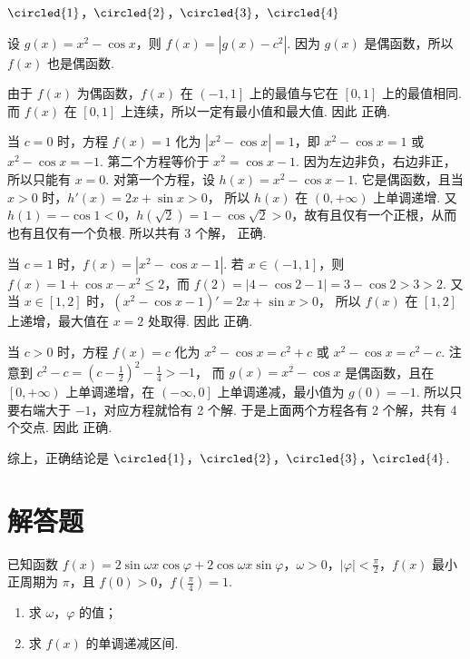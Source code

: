\documentclass[UTF8,a4paper,oneside,11pt]{ctexbook}
\begin{document}
\begin{answer}
\(\circled{1}\)，\(\circled{2}\)，\(\circled{3}\)，\(\circled{4}\)
\end{answer}

\begin{solution}
设 \( g(x)=x^2-\cos x \)，则 \( f(x)=\left| g(x)-c^2 \right| \). 因为 \( g(x) \) 是偶函数，所以 \( f(x) \) 也是偶函数.

 由于 \( f(x) \) 为偶函数，\( f(x) \) 在 \( \left( -1,1 \right] \) 上的最值与它在 \( \left[ 0,1 \right] \) 上的最值相同. 而 \( f(x) \) 在 \( \left[ 0,1 \right] \) 上连续，所以一定有最小值和最大值. 因此  正确.

 当 \( c=0 \) 时，方程 \( f(x)=1 \) 化为 \( \left| x^2-\cos x \right|=1 \)，即 \( x^2-\cos x=1 \) 或 \( x^2-\cos x=-1 \).
第二个方程等价于 \( x^2=\cos x-1 \). 因为左边非负，右边非正，所以只能有 \( x=0 \).
对第一个方程，设 \( h(x)=x^2-\cos x-1 \). 它是偶函数，且当 \( x>0 \) 时，\( h'\left( x \right)=2x+\sin x>0 \)，
所以 \( h(x) \) 在 \( \left( 0,+\infty \right) \) 上单调递增. 又 \( h(1)=-\cos 1<0 \)，\( h\left( \sqrt{2} \right)=1-\cos \sqrt{2}>0 \)，故有且仅有一个正根，从而也有且仅有一个负根. 所以共有 3 个解， 正确.

 当 \( c=1 \) 时，\( f(x)=\left| x^2-\cos x-1 \right| \). 若 \( x\in \left( -1,1 \right] \)，则 \( f(x)=1+\cos x-x^2\le 2 \)，而 \( f(2)=\left| 4-\cos 2-1 \right|=3-\cos 2>3>2 \). 又当 \( x\in \left[ 1,2 \right] \) 时，\( \left( x^2-\cos x-1 \right)'=2x+\sin x>0 \)，
所以 \( f(x) \) 在 \( \left[ 1,2 \right] \) 上递增，最大值在 \( x=2 \) 处取得. 因此  正确.

 当 \( c>0 \) 时，方程 \( f(x)=c \) 化为 \( x^2-\cos x=c^2+c \) 或 \( x^2-\cos x=c^2-c \). 注意到 \( c^2-c=\left( c-\frac{1}{2} \right)^2-\frac{1}{4}>-1 \)，
而 \( g(x)=x^2-\cos x \) 是偶函数，且在 \( \left[ 0,+\infty \right) \) 上单调递增，在 \( \left( -\infty,0 \right] \) 上单调递减，最小值为 \( g(0)=-1 \). 所以只要右端大于 \( -1 \)，对应方程就恰有 2 个解. 于是上面两个方程各有 2 个解，共有 4 个交点. 因此  正确.

综上，正确结论是 \(\circled{1}\)，\(\circled{2}\)，\(\circled{3}\)，\(\circled{4}\).
\end{solution}
\section{解答题}

\begin{problem}
已知函数 \( f(x)=2\sin \omega x\cos \varphi+2\cos \omega x\sin \varphi \)，\( \omega>0 \)，\( \left| \varphi \right|<\frac{\pi}{2} \)，\( f(x) \) 最小正周期为 \( \pi \)，且 \( f(0)>0 \)，\( f\left( \frac{\pi}{4} \right)=1 \).

\begin{enumerate}
\item 求 \( \omega \)，\( \varphi \) 的值；
\item 求 \( f(x) \) 的单调递减区间.
\end{enumerate}
\end{problem}
\end{document}
